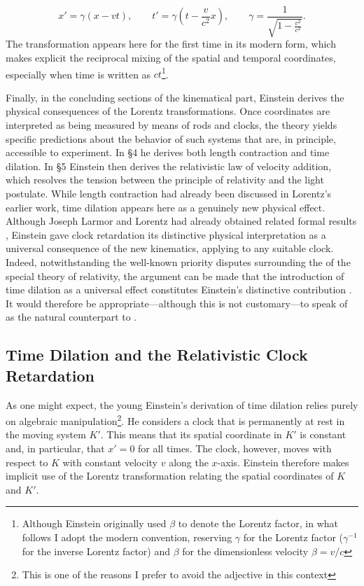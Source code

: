 \documentclass[submitted,12pt]{article}
\newcommand{\igamma}{\ensuremath{\gamma^{-1}}\xspace}
\begin{document}
$$
x'=\gamma(x-vt),\qquad
t'=\gamma\!\left(t-\frac{v}{c^{2}}x\right),
\qquad
\gamma=\frac{1}{\sqrt{1-\frac{v^{2}}{c^{2}}}}.
$$
%
The transformation appears here for the first time in its modern form, which makes explicit the reciprocal mixing of the spatial and temporal coordinates, especially when time is written as $ct$\footnote{Although Einstein originally used $\beta$ to denote the Lorentz factor, in what follows I adopt the modern convention, reserving $\gamma$ for the Lorentz factor (\igamma for the inverse Lorentz factor) and $\beta$ for the dimensionless velocity $\beta=v/c$}.

Finally, in the concluding sections of the kinematical part, Einstein derives the physical consequences of the Lorentz transformations. Once coordinates are interpreted as being measured by means of rods and clocks, the theory yields specific predictions about the behavior of such systems that are, in principle, accessible to experiment. In \S4 he derives both length contraction and time dilation. In \S5 Einstein then derives the relativistic law of velocity addition, which resolves the tension between the principle of relativity and the light postulate. While length contraction had already been discussed in Lorentz’s earlier work, time dilation appears here as a genuinely new physical effect. Although Joseph Larmor and Lorentz had already obtained related formal results \citep[sec.~4.4 and~4.5]{Brown2005}, Einstein gave clock retardation its distinctive physical interpretation as a universal consequence of the new kinematics, applying to any suitable clock. Indeed, notwithstanding the well-known priority disputes surrounding the  of the special theory of relativity, the argument can be made that the introduction of time dilation as a universal effect constitutes Einstein’s distinctive contribution \citep{Rindler1970}. It would therefore be appropriate—although this is not customary—to speak of  as the natural counterpart to . 




\subsection{Time Dilation and the Relativistic Clock Retardation}
%
As one might expect, the young Einstein's derivation of time dilation relies purely on algebraic manipulation\footnote{This is one of the reasons I prefer to avoid the adjective  in this context}. He considers a clock that is permanently at rest in the moving system $K'$. This means that its spatial coordinate in $K'$ is constant and, in particular, that $x' = 0$ for all times. The clock, however, moves with respect to $K$ with constant velocity $v$ along the $x$-axis. Einstein therefore makes implicit use of the Lorentz transformation relating the spatial coordinates of $K$ and $K'$.
\end{document}
